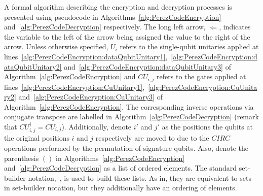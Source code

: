 A formal algorithm describing the encryption and decryption processes is presented using pseudocode in Algorithms~\ref{alg:PerezCodeEncryption} and~\ref{alg:PerezCodeDecryption} respectively. The long left arrow, $\Longleftarrow$, indicates the variable to the left of the arrow being assigned the value to the right of the arrow. Unless otherwise specified, $U_i$ refers to the single-qubit unitaries applied at lines~\ref{alg:PerezCodeEncryption:dataQubitUnitary1},~\ref{alg:PerezCodeEncryption:dataQubitUnitary2} and~\ref{alg:PerezCodeEncryption:dataQubitUnitary3} of Algorithm~\ref{alg:PerezCodeEncryption} and $\mathit{CU}_{i,j}$ refers to the gates applied at lines~\ref{alg:PerezCodeEncryption:CuUnitary1},~\ref{alg:PerezCodeEncryption:CuUnitary2} and~\ref{alg:PerezCodeEncryption:CuUnitary3} of Algorithm~\ref{alg:PerezCodeEncryption}. The corresponding inverse operations via conjugate transpose are labelled in Algorithm~\ref{alg:PerezCodeDecryption} (remark that $\mathit{CU}_{i,j}^{\dagger} = \mathit{CU}_{i,j}$). Additionally, denote $i'$ and $j'$ as the positions the qubits at the original positions $i$ and $j$ respectively are moved to due to the $\mathit{CIRC}$ operations performed by the permutation of signature qubits. Also, denote the parenthesis $()$ in Algorithms~\ref{alg:PerezCodeEncryption} and~\ref{alg:PerezCodeDecryption} as a list of ordered elements. The standard set-builder notation,~\cite{setBuilderNotationWikipedia}, is used to build these lists. As in, they are equivalent to sets in set-builder notation, but they additionally have an ordering of elements.

